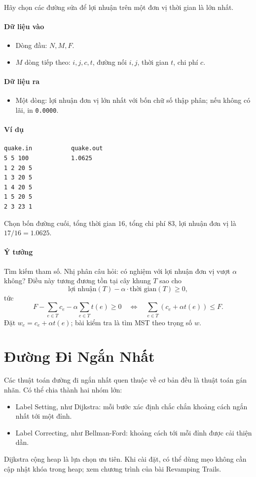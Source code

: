 \documentclass[11pt]{article}
\newcommand{\iosec}[1]{\paragraph{#1}}
\begin{document}
Hãy chọn các đường sửa để lợi nhuận trên một đơn vị thời gian là lớn nhất.

\iosec{Dữ liệu vào}
\begin{itemize}
  \item Dòng đầu: \(N,M,F\).
  \item \(M\) dòng tiếp theo: \(i,j,c,t\), đường nối \(i,j\), thời gian \(t\), chi phí \(c\).
\end{itemize}

\iosec{Dữ liệu ra}
\begin{itemize}
  \item Một dòng: lợi nhuận đơn vị lớn nhất với bốn chữ số thập phân; nếu không có lãi, in \texttt{0.0000}.
\end{itemize}

\iosec{Ví dụ}
\begin{verbatim}
quake.in           quake.out
5 5 100            1.0625
1 2 20 5
1 3 20 5
1 4 20 5
1 5 20 5
2 3 23 1
\end{verbatim}

Chọn bốn đường cuối, tổng thời gian \(16\), tổng chi phí \(83\), lợi nhuận đơn vị là \(17/16=1.0625\).

\iosec{Ý tưởng}
Tìm kiếm tham số. Nhị phân câu hỏi: có nghiệm với lợi nhuận đơn vị vượt \(\alpha\) không? Điều này tương đương tồn tại cây khung \(T\) sao cho
\[
  \text{lợi nhuận}(T)-\alpha\cdot \text{thời gian}(T)\ge 0,
\]
tức
\[
  F-\sum_{e\in T}c_e-\alpha\sum_{e\in T}t(e)\ge 0
  \quad\Longleftrightarrow\quad
  \sum_{e\in T}\left(c_e+\alpha t(e)\right)\le F.
\]
Đặt \(w_e=c_e+\alpha t(e)\); bài kiểm tra là tìm MST theo trọng số \(w\).

\section{Đường Đi Ngắn Nhất}

Các thuật toán đường đi ngắn nhất quen thuộc về cơ bản đều là thuật toán gán nhãn. Có thể chia thành hai nhóm lớn:
\begin{itemize}
  \item Label Setting, như Dijkstra: mỗi bước xác định chắc chắn khoảng cách ngắn nhất tới một đỉnh.
  \item Label Correcting, như Bellman-Ford: khoảng cách tới mỗi đỉnh được cải thiện dần.
\end{itemize}

Dijkstra cộng heap là lựa chọn ưu tiên. Khi cài đặt, có thể dùng mẹo không cần cập nhật khóa trong heap; xem chương trình của bài Revamping Trails.
\end{document}
